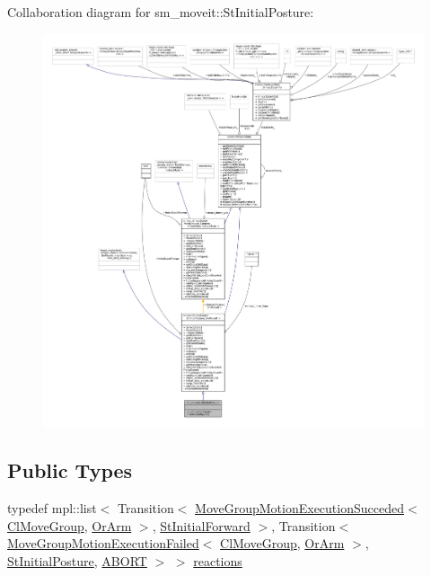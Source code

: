 Collaboration diagram for sm\+\_\+moveit\+:\+:St\+Initial\+Posture\+:
\nopagebreak
\begin{figure}[H]
\begin{center}
\leavevmode
\includegraphics[width=350pt]{structsm__moveit_1_1StInitialPosture__coll__graph}
\end{center}
\end{figure}
\subsection*{Public Types}
\begin{DoxyCompactItemize}
\item 
typedef mpl\+::list$<$ Transition$<$ \hyperlink{structmoveit__z__client_1_1MoveGroupMotionExecutionSucceded}{Move\+Group\+Motion\+Execution\+Succeded}$<$ \hyperlink{classmoveit__z__client_1_1ClMoveGroup}{Cl\+Move\+Group}, \hyperlink{classsm__moveit_1_1OrArm}{Or\+Arm} $>$, \hyperlink{structsm__moveit_1_1StInitialForward}{St\+Initial\+Forward} $>$, Transition$<$ \hyperlink{structmoveit__z__client_1_1MoveGroupMotionExecutionFailed}{Move\+Group\+Motion\+Execution\+Failed}$<$ \hyperlink{classmoveit__z__client_1_1ClMoveGroup}{Cl\+Move\+Group}, \hyperlink{classsm__moveit_1_1OrArm}{Or\+Arm} $>$, \hyperlink{structsm__moveit_1_1StInitialPosture}{St\+Initial\+Posture}, \hyperlink{classABORT}{A\+B\+O\+RT} $>$ $>$ \hyperlink{structsm__moveit_1_1StInitialPosture_ab6ac709f3c2758548901bc425791149c}{reactions}
\end{DoxyCompactItemize}
